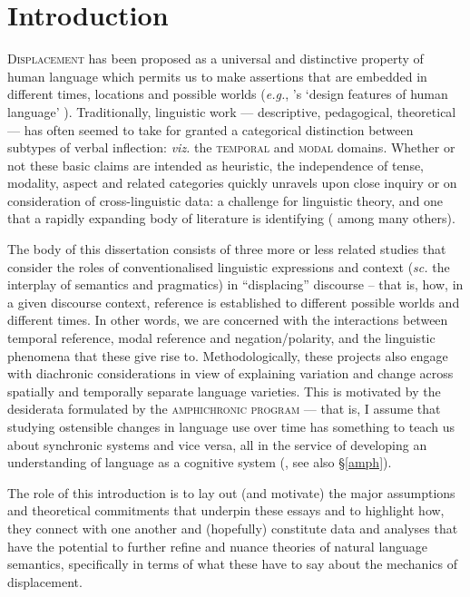 \documentclass[12pt,dvipsnames]{report}
\begin{document}
\chapter{Introduction}%
%
\label{IntroCh}
\lettrine{D}{isplacement} has been proposed as a universal and distinctive property of human language which permits us to make assertions that are embedded in different times, locations and possible worlds (\textit{e.g.}, \citeauthor{Hockett1960}'s `design features of human language' \citeyear[90]{Hockett1960}). Traditionally, linguistic work --- descriptive, pedagogical, theoretical --- has often seemed to take for granted a categorical distinction between subtypes of verbal inflection: \textit{viz.} the \textsc{temporal} and \textsc{modal} domains. Whether or not these basic claims are intended as heuristic, the independence of tense, modality, aspect and related categories quickly unravels upon close inquiry or on consideration of cross-linguistic data: a challenge for linguistic theory, and one that a rapidly expanding body of literature is identifying  (\citealp[\textit{e.g.},][]{Condoravdi2002,Laca2012,Hacquard2006,Rullmann2018} among many others).


The body of this dissertation consists of three more or less related studies that consider the roles of conventionalised linguistic expressions and context (\textit{sc.} the interplay of semantics and pragmatics) in ``displacing'' discourse -- that is, how, in a given discourse context, reference is established to different possible worlds and different times. In other words, we are concerned with the interactions between temporal reference, modal reference and negation/polarity, and the linguistic phenomena that these give rise to. Methodologically, these projects also engage with diachronic considerations in view of explaining variation and change across spatially and temporally separate language varieties. This is motivated by the desiderata formulated by the \textsc{amphichronic program} --- that is, I assume that studying ostensible changes in language use over time has something to teach us about synchronic systems and vice versa, all in the service of developing an understanding of language as a cognitive system (\citealp[\textit{e.g.},][]{Kiparsky2006,Deo2015,Anderson2016a}, see also \S\thinspace\ref{amph}).

The role of this introduction is to lay out (and motivate) the major assumptions and theoretical commitments that underpin these essays and to highlight how, they connect with one another and (hopefully) constitute data and analyses that have the potential to further refine and nuance theories of natural language semantics, specifically in terms of what these have to say about the mechanics of displacement.
\end{document}
